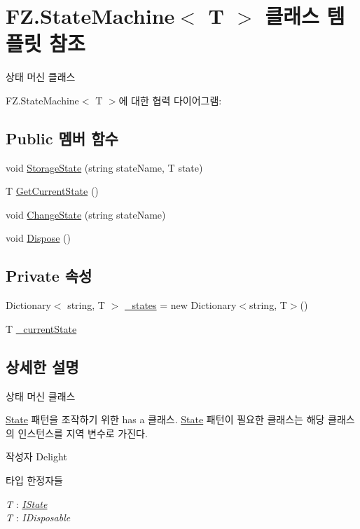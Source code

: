 \hypertarget{class_f_z_1_1_state_machine}{}\section{F\+Z.\+State\+Machine$<$ T $>$ 클래스 템플릿 참조}
\label{class_f_z_1_1_state_machine}


상태 머신 클래스  




F\+Z.\+State\+Machine$<$ T $>$에 대한 협력 다이어그램\+:
\subsection*{Public 멤버 함수}
\begin{DoxyCompactItemize}
\item 
void \hyperlink{class_f_z_1_1_state_machine_aeaffed122a66905daa001170cde557b2}{Storage\+State} (string state\+Name, T state)
\item 
T \hyperlink{class_f_z_1_1_state_machine_ad85bc1c80792ce8c766fab8ec4c9eac3}{Get\+Current\+State} ()
\item 
void \hyperlink{class_f_z_1_1_state_machine_ab275998adcf7e25994116544f56c829d}{Change\+State} (string state\+Name)
\item 
void \hyperlink{class_f_z_1_1_state_machine_aceccdcc753e18d4886b319c6abcb78b3}{Dispose} ()
\end{DoxyCompactItemize}
\subsection*{Private 속성}
\begin{DoxyCompactItemize}
\item 
Dictionary$<$ string, T $>$ \hyperlink{class_f_z_1_1_state_machine_a9b898e40ec3b434b5a60ef1e4d51cc80}{\+\_\+states} = new Dictionary$<$string, T$>$()
\item 
T \hyperlink{class_f_z_1_1_state_machine_a71de6122cd9b9d84048f679b1bb47c9f}{\+\_\+current\+State}
\end{DoxyCompactItemize}


\subsection{상세한 설명}
상태 머신 클래스 

\hyperlink{class_f_z_1_1_state}{State} 패턴을 조작하기 위한 has a 클래스. \hyperlink{class_f_z_1_1_state}{State} 패턴이 필요한 클래스는 해당 클래스의 인스턴스를 지역 변수로 가진다. \begin{DoxyAuthor}{작성자}
Delight 
\end{DoxyAuthor}
\begin{Desc}
\item[타입 한정자들]\begin{description}
\item[{\em T} : {\em \hyperlink{interface_f_z_1_1_i_state}{I\+State}}]\item[{\em T} : {\em I\+Disposable}]\end{description}
\end{Desc}


